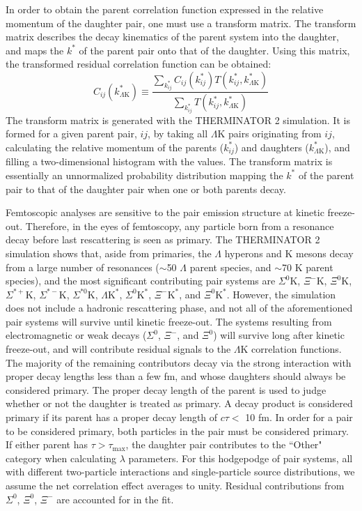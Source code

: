 \documentclass[ALICE,manyauthors]{cernphprep}
\newcommand{\kstar}{$k^{*}$\xspace}
\newcommand{\Lam}{$\Lambda$\xspace}
\newcommand{\LamK}{$\Lambda$K\xspace}
\begin{document}
In order to obtain the parent correlation function expressed in the relative momentum of the daughter pair, one must use a transform matrix.
The transform matrix describes the decay kinematics of the parent system into the daughter, and maps the \kstar of the parent pair onto that of the daughter.
Using this matrix, the transformed residual correlation function can be obtained:
\begin{equation}
  C_{ij}(k^{*}_{\Lambda\mathrm{K}}) \equiv \frac{\sum\limits_{k^{*}_{ij}} C_{ij}\left(k^{*}_{ij}\right) T\left(k^{*}_{ij},k^{*}_{\Lambda\mathrm{K}}\right)}{\sum\limits_{k^{*}_{ij}} T\left(k^{*}_{ij},k^{*}_{\Lambda\mathrm{K}}\right)}
\label{eqn:ResidualsTransform}
\end{equation}
The transform matrix is generated with the THERMINATOR 2 \cite{Chojnacki:2011hb} simulation. 
It is formed for a given parent pair, $ij$, by taking all \LamK pairs originating from $ij$, calculating the relative momentum of the parents ($k^{*}_{ij}$) and daughters ($k^{*}_{\Lambda\mathrm{K}}$), and filling a two-dimensional histogram with the values. 
The transform matrix is essentially an unnormalized probability distribution mapping the \kstar of the parent pair to that of the daughter pair when one or both parents decay.

Femtoscopic analyses are sensitive to the pair emission structure at kinetic freeze-out.
Therefore, in the eyes of femtoscopy, any particle born from a resonance decay before last rescattering is seen as primary.
The THERMINATOR 2 simulation shows that, aside from primaries, the \Lam hyperons and K mesons decay from a large number of resonances ($\sim$50 \Lam parent species, and $\sim$70 K parent species), and the most significant contributing pair systems are $\Sigma^{0}$K, $\Xi^{-}$K, $\Xi^{0}$K, $\Sigma^{*+}$K, $\Sigma^{*-}$K, $\Sigma^{*0}$K, $\Lambda\mathrm{K}^{*}$, $\Sigma^{0}\mathrm{K}^{*}$, $\Xi^{-}\mathrm{K}^{*}$, and $\Xi^{0}\mathrm{K}^{*}$.
However, the simulation does not include a hadronic rescattering phase, and not all of the aforementioned pair systems will survive until kinetic freeze-out.
The systems resulting from electromagnetic or weak decays ($\Sigma^{0}$, $\Xi^{-}$, and $\Xi^{0}$) will survive long after kinetic freeze-out, and will contribute residual signals to the \LamK correlation functions.
The majority of the remaining contributors decay via the strong interaction with proper decay lengths less than a few fm, and whose daughters should always be considered primary.
The proper decay length of the parent is used to judge whether or not the daughter is treated as primary.
A decay product is considered primary if its parent has a proper decay length of $c\tau <$ 10 fm.
In order for a pair to be considered primary, both particles in the pair must be considered primary. 
If either parent has $\tau > \tau_{\mathrm{max}}$, the daughter pair contributes to the ``Other" category when calculating $\lambda$ parameters.
For this hodgepodge of pair systems, all with different two-particle interactions and single-particle source distributions, we assume the net correlation effect averages to unity.
Residual contributions from $\Sigma^{0}$, $\Xi^{0}$, $\Xi^{-}$ are accounted for in the fit.
\end{document}
